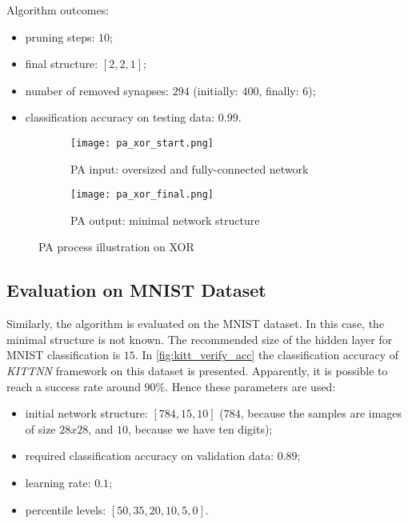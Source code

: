 Algorithm outcomes:
\begin{itemize}
\item pruning steps: $ 10 $;
\item final structure: $ [2, 2, 1] $;
\item number of removed synapses: $ 294 $ (initially: $ 400 $, finally: $ 6 $);
\item classification accuracy on testing data: $ 0.99 $.
\end{itemize}

\begin{figure}[H]
\centering
\begin{subfigure}{0.4\textwidth}
  \centering
  \texttt{[image: pa\_xor\_start.png]}
  \caption{PA input: oversized and fully-connected network}
  \label{img:pa_xor_start}
\end{subfigure}%
\begin{subfigure}{0.4\textwidth}
  \centering
  \texttt{[image: pa\_xor\_final.png]}
  \caption{PA output: minimal network structure}
  \label{img:pa_xor_final}
\end{subfigure}
\caption{PA process illustration on XOR}
\label{img:pa_xor_morph}
\end{figure}

\subsection{Evaluation on MNIST Dataset} \label{ssec:evaluation_on_mnist}
Similarly, the algorithm is evaluated on the MNIST dataset. In this case, the minimal structure is not known. The recommended size of the hidden layer for MNIST classification is $ 15 $. In \cref{fig:kitt_verify_acc} the classification accuracy of \textit{KITTNN} framework on this dataset is presented. Apparently, it is possible to reach a success rate around $ 90\% $. Hence these parameters are used:

\begin{itemize}
\item initial network structure: $ [784, 15, 10] $ ($ 784 $, because the samples are images of size $ 28x28 $, and $ 10 $, because we have ten digits);
\item required classification accuracy on validation data: $ 0.89 $;
\item learning rate: $ 0.1 $;
\item percentile levels: $ [50, 35, 20, 10, 5, 0] $.
\end{itemize}

